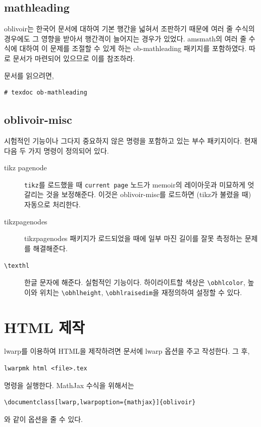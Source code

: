 \documentclass[
	12pt,
	a4paper,
	kosection,
	footnote,
	nobookmarks,
	microtype,
	figtabcapt,
]{oblivoir}
\def\cs#1{\texttt{\textbackslash #1}}
\begin{document}
\subsection{mathleading}

oblivoir는 한국어 문서에 대하여 기본 행간을 넓혀서 조판하기 때문에 여러 줄 수식의 경우에도
그 영향을 받아서 행간격이 늘어지는 경우가 있었다.
\textsf{amsmath}의 여러 줄 수식에 대하여 이 문제를 조절할 수 있게 하는 \textsf{ob-mathleading}
패키지를 포함하였다. 따로 문서가 마련되어 있으므로 이를 참조하라.

\begin{boxedverbatim}
\usepackage{ob-mathleading}
\end{boxedverbatim}

문서를 읽으려면,
\begin{verbatim}
# texdoc ob-mathleading
\end{verbatim}

\subsection{oblivoir-misc}

시험적인 기능이나 그다지 중요하지 않은 명령을 포함하고 있는 
부수 패키지이다. 현재 다음 두 가지 명령이 정의되어 있다.

\begin{description}
\item[tikz pagenode] \texttt{tikz}를 로드했을 때 \texttt{current page}
노드가 memoir의 레이아웃과 미묘하게 엇갈리는 것을 보정해준다. 이것은 oblivoir-misc를 로드하면 (tikz가 불렸을 때) 자동으로 처리한다.
\item[tikzpagenodes] tikzpagenodes 패키지가 로드되었을 때에 일부 마진 길이를
잘못 측정하는 문제를 해결해준다.
\item[\cs{texthl}] 한글 문자에 해준다. 실험적인 기능이다.
하이라이트할 색상은 \cs{obhlcolor}, 높이와
위치는 \cs{obhlheight}, \cs{obhlraisedim}을 재정의하여 설정할 수 있다.
\end{description}


\section{HTML 제작}

\textsf{lwarp}를 이용하여 HTML을 제작하려면 문서에 \textsf{lwarp} 
옵션을 주고 작성한다. 그 후,
\begin{verbatim}
lwarpmk html <file>.tex
\end{verbatim}
명령을 실행한다. MathJax 수식을 위해서는 
\begin{verbatim}
\documentclass[lwarp,lwarpoption={mathjax}]{oblivoir}
\end{verbatim}
와 같이 옵션을 줄 수 있다.
\end{document}

